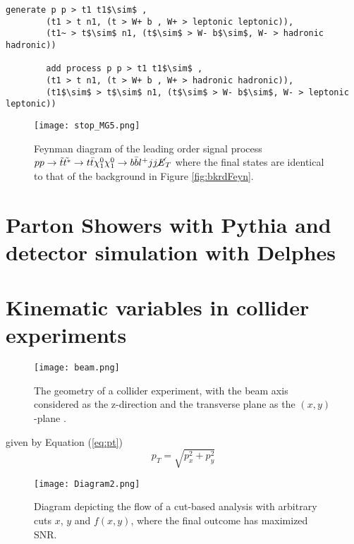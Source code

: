 \begin{lstlisting}[mathescape = true]
         generate p p > t1 t1$\sim$ ,
        (t1 > t n1, (t > W+ b , W+ > leptonic leptonic)),
        (t1~ > t$\sim$ n1, (t$\sim$ > W- b$\sim$, W- > hadronic hadronic))
        
        add process p p > t1 t1$\sim$ , 
        (t1 > t n1, (t > W+ b , W+ > hadronic hadronic)), 
        (t1$\sim$ > t$\sim$ n1, (t$\sim$ > W- b$\sim$, W- > leptonic leptonic))
\end{lstlisting}



\begin{figure}[htbp]
    \centering
    \texttt{[image: stop\_MG5.png]}
    \caption{Feynman diagram of the leading order signal process $ pp \rightarrow \Tilde{t}\Tilde{t^*} \rightarrow t \Bar{t} \chi^0_1\chi^0_1 \rightarrow b\Bar{b}l^{+}jj\cancel{\it{E}}_{T} $ where the final states are identical to that of the background in Figure \ref{fig:bkrdFeyn}. }
    \label{fig:sigFeyn}
\end{figure}


\section{Parton Showers with Pythia and detector simulation with Delphes}


\section{Kinematic variables in collider experiments}


\begin{figure}[htbp]
    \centering
    \texttt{[image: beam.png]}
    \caption{The geometry of a collider experiment, with the beam axis considered as the z-direction and the transverse plane as the $(x,y)$-plane \cite{barr2011guide}.}
    \label{fig:beam}
\end{figure}
 given by Equation (\ref{eq:pt})
\begin{equation}
    p_T = \sqrt{p_x^2 + p_y^2}
    \label{eq:pt}
\end{equation}

\begin{figure}[htbp]
    \centering
    \texttt{[image: Diagram2.png]}
    \caption{Diagram depicting the flow of a cut-based analysis with arbitrary cuts $x$, $y$ and $f(x,y)$, where the final outcome has maximized SNR.}
    \label{fig:cut}
\end{figure}
